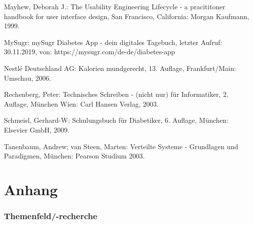 \documentclass[a4paper,11pt]{article}%
\renewcommand{\\}{\vspace*{0.5\baselineskip} \newline}
\begin{document}
\begin{thebibliography}{1}
		
		Mayhew, Deborah J.: 
		The Usability Engineering Lifecycle - a pracititoner handbook for user interface design,
		San Francisco, California: Morgan Kaufmann,
		1999.
		
		MySugr:
		mySugr Diabetes App - dein digitales Tagebuch, letzter Aufruf: 30.11.2019, von:	
		https://mysugr.com/de-de/diabetes-app
		
		Nestlé Deutschland AG: 
		Kalorien mundgerecht, 13. Auflage, Frankfurt/Main: Umschau,
		2006.
		
		Rechenberg, Peter: 
		Technisches Schreiben - (nicht nur) für Informatiker, 2. Auflage,
		München Wien: Carl Hansen Verlag,
		2003.
		
		Schmeisl, Gerhard-W: 
		Schulungsbuch für Diabetiker, 6. Auflage, 
		München: Elsevier GmbH,
		2009.
		
		Tanenbaum, Andrew; van Steen, Marten: 
		Verteilte Systeme - Grundlagen und Paradigmen,
		München: Pearson Studium
		2003.
		
	\end{thebibliography}
	\newpage
	\appendix
	\vspace*{\fill}
	\part*{Anhang}
	\setcounter{section}{0}%
	\setcounter{subsection}{0}%
	\setcounter{figure}{0}
	\renewcommand{\thesection}{\Alph{section}}
	\renewcommand\thefigure{\Alph{section}\arabic{figure}}
	\vfill
	\newpage
	
	
	
	\section{Themenfeld/-recherche}
	\label{section:Themenfeld}
\end{document}
